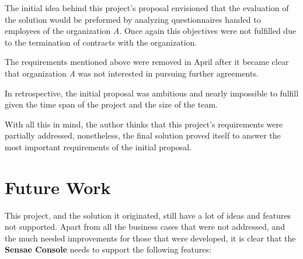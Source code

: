 The initial idea behind this project's proposal envisioned that the evaluation of the solution would be preformed by analyzing questionnaires handed to employees of the organization \textit{A}. Once again this objectives were not fulfilled due to the termination of contracts with the organization.

The requirements mentioned above were removed in April after it became clear that organization \textit{A} was not interested in pursuing further agreements.

In retrospective, the initial proposal was ambitious and nearly impossible to fulfill given the time span of the project and the size of the team.

With all this in mind, the author thinks that this project's requirements were partially addressed, nonetheless, the final solution proved itself to answer the most important requirements of the initial proposal.

\section{Future Work}
\label{sec:conclusion:future}

This project, and the solution it originated, still have a lot of ideas and features not supported. Apart from all the business cases that were not addressed, and the much needed improvements for those that were developed, it is clear that the \textbf{Sensae Console} needs to support the following features:

